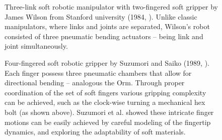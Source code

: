 \begin{figure}[!t]
  \vspace{-2mm}
  \ifx\printFigures\undefined
  \else
  \centering
  
  \fi
  \caption{Three-link soft robotic manipulator with two-fingered soft gripper by James Wilson from Stanford university (1984, \cite{Wilson2007}). Unlike classic manipulators, where links and joints are separated, Wilson's robot consisted of three pneumatic bending actuators -- being link and joint simultaneously. 
  \vspace{-4mm}
  \label{fig:C0:fist_srm_robot}}
\end{figure}

\begin{figure}[!t]
  \vspace{-3mm}
  \ifx\printFigures\undefined
  \else
  \centering
  
  \fi
  \caption{Four-fingered soft robotic gripper by Suzumori and Saiko (1989, \cite{Suzumori1991,Suzumori1992}). Each finger possess three pneumatic chambers that allow for directional bending -- analogous the Orm. Through proper coordination of the set of soft fingers various gripping complexity can be achieved, such as the clock-wise turning a mechanical hex bolt (as shown above). Suzumori et al. showed these intricate finger motions can be easily achieved by careful modeling of the fingertip dynamics, and exploring the adaptability of soft materials.
  \label{fig:C0:fist_grip_robot}}
  \vspace{-3mm}
\end{figure}


